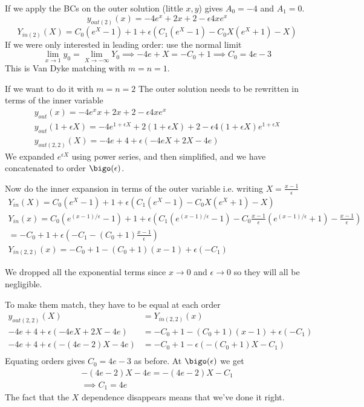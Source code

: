 \documentclass{X:/Documents/Coding/Latex/myassignment}
\begin{document}
If we apply the BCs on the outer solution (little $x,y$) gives $A_0 = -4$ and $A_1 =0$. 
\[y_{out(2)}(x) = -4e^x + 2x + 2 - \epsilon 4xe^x\]
\[Y_{in(2)}(X) = C_0(e^X -1) + 1 + \epsilon(C_1(e^X -1) - C_0X(e^X + 1) - X)\]
If we were only interested in leading order: use the normal limit 
\[\lim_{x\to 1} y_0 = \lim_{X\to-\infty} Y_0 \implies -4e +X = -C_0 +1 \implies C_0 = 4e-3\]
This is Van Dyke matching with $m=n=1$.

If we want to do it with $m=n=2$ The outer solution needs to be rewritten in terms of the inner variable
\begin{align*}
    y_{out}(x) =-4e^xx + 2x + 2 -\epsilon 4xe^x \\
    y_{out}(1+\epsilon X) = -4e^{1+\epsilon X} +2 (1+\epsilon X)+2 -\epsilon 4(1+\epsilon X) e^{1+\epsilon X}\\
    y_{out(2,2)}(X) = -4e + 4 + \epsilon(-4eX + 2X - 4e)
\end{align*}
We expanded $e^{\epsilon X}$ using power series, and then simplified, and we have concatenated to order $\bigo(\epsilon)$.


Now do the inner expansion in terms of the outer variable i.e. writing $X = \frac{x-1}{\epsilon}$
\begin{align*}
    Y_{in}(X) = C_0(e^X - 1) + 1 + \epsilon \left(C_1(e^X - 1) - C_0 X(e^X +1) -X\right)\\
    Y_{in}(x) = C_0(e^{(x-1)/\epsilon} -1 )+1 + \epsilon\left(C_1 (e^{(x-1)/\epsilon} -1) - C_0\frac{x-1}{\epsilon}(e^{(x-1)/\epsilon}+1 ) - \frac{x-1}{\epsilon}\right)\\
    = -C_0 + 1 + \epsilon\left(-C_1 - (C_0 +1) \frac{x-1}{\epsilon}\right)\\
    Y_{in(2,2)}(x) = -C_0 + 1 - (C_0 + 1) (x-1) + \epsilon(-C_1)
\end{align*}

We dropped all the exponential terms since $x\to 0$ and $\epsilon\to 0$ so they will all be negligible.

To make them match, they have to be equal at each order
\begin{align*}
    y_{out(2,2)}(X) &= Y_{in(2,2)}(x)\\
    -4e + 4 + \epsilon(-4eX + 2X - 4e) &= -C_0 + 1 - (C_0 + 1) (x-1) + \epsilon(-C_1)\\
    -4e + 4 + \epsilon(-(4e- 2)X - 4e) &= -C_0 + 1 - \epsilon(-(C_0 + 1)X - C_1)\\
\end{align*}
Equating orders gives $C_0 = 4e-3$ as before. At $\bigo(\epsilon)$ we get
\begin{align*}
    -(4e - 2)X - 4e = -(4e - 2)X - C_1\\
    \implies C_1 = 4e
\end{align*}
The fact that the $X$ dependence disappears means that we've done it right.
\end{document}
